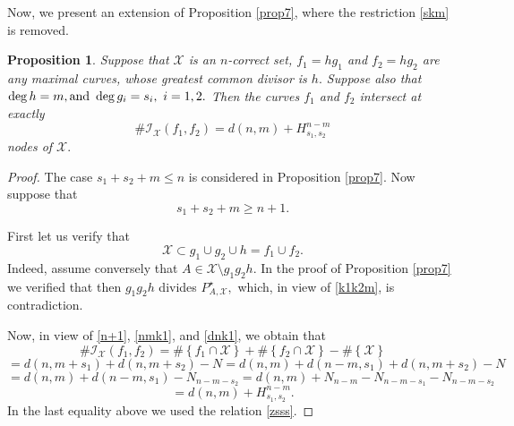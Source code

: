 \documentclass[a4paper,12pt]{article}
\newtheorem{proposition}[lemma]{Proposition}
\theoremstyle{definition}
\numberwithin{equation}{section}
\numberwithin{figure}{section}
\newcommand{\Iset}{\mathcal{I}}
\newcommand{\Xset}{\mathcal{X}}
\begin{document}
Now, we present an extension of Proposition \ref{prop7}, where the restriction \eqref{skm} is removed.
\begin{proposition}\label{prop8}
Suppose that $\Xset$ is an $n$-correct set, $f_1=hg_1$ and $f_2=hg_2$ are any 
maximal curves, whose greatest common divisor is $h.$ Suppose also that  $\deg h=m,\hbox{and}\ \deg g_i=s_i,\ i=1,2.$ Then the %
curves $f_1$ and $f_2$ intersect at exactly 
\begin{equation}\label{nm++}\#\Iset_\Xset(f_1,f_2) =d(n,m)+H_{s_1,s_2}^{n-m}\end{equation} nodes of $\Xset.$
\end{proposition}
\begin{proof} %


The case $s_1+s_2+m\le n$ is considered in Proposition \ref{prop7}. Now suppose that 
\begin{equation} \label{k1k2m} s_1+s_2+m\ge n+1.
\end{equation}

First let us verify that 
\begin{equation}\label{n+1}
	\Xset \subset g_1 \cup g_2 \cup h = f_1\cup f_2.
\end{equation} Indeed, assume conversely that $A\in \Xset\setminus g_1g_2h.$
In the proof of Proposition \ref{prop7} we verified that then $g_1g_2h$ divides $P^\star_{A,\Xset},$ which, in view of \eqref{k1k2m}, is contradiction.
  
Now, in view of \eqref{n+1}, \eqref{nmk1}, and \eqref{dnk1}, we obtain that
$$\#\Iset_\Xset(f_1,f_2) = \#\left\{f_1\cap \Xset\right\}+\#\left\{f_2\cap \Xset\right\}-\#\left\{\Xset\right\}$$ $$= d(n,m+s_1)+d(n,m+s_2)- N
= d(n,m)+d(n-m,s_1)+d(n,m+s_2)- N$$ $$= d(n,m)+d(n-m,s_1)- N_{n-m-s_2}
= d(n,m)+N_{n-m}-N_{n-m-s_1}- N_{n-m-s_2}$$ $$= d(n,m)+H_{s_1,s_2}^{n-m}.$$
In the last equality above we used the relation \eqref{zsss}. 
\end{proof}
\end{document}
